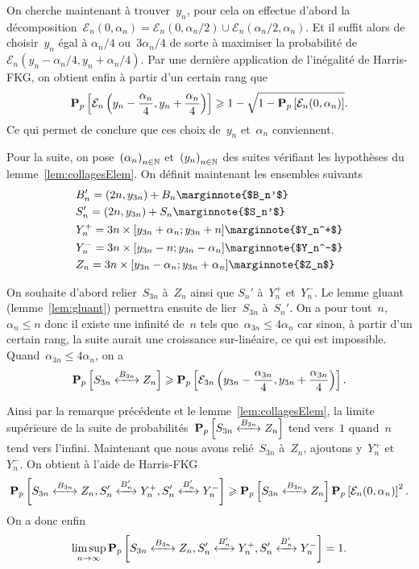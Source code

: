 \begin{dem}
		On cherche maintenant à trouver~$y_n$, pour cela on effectue d'abord la décomposition~$\mathcal{E}_n(0, \alpha_n) = \mathcal{E}_n(0, \alpha_n/2) \cup \mathcal{E}_n(\alpha_n/2, \alpha_n)$. Et il suffit alors de choisir~$y_n$ égal à $\alpha_n/4$ ou~$3\alpha_n/4$ de sorte à maximiser la probabilité de~$\mathcal{E}_n(y_n - \alpha_n/4, y_n + \alpha_n/4)$. Par une dernière application de l'inégalité de Harris-FKG, on obtient enfin à partir d'un certain rang que
		\[
			\bm{\mathrm{P}}_{p}\left[\mathcal{E}_n\left(y_n - \frac{\alpha_n}{4}, y_n + \frac{\alpha_n}{4}\right)\right]
					\geqslant 1 - \sqrt{1 - \bm{\mathrm{P}}_{p}\left[\mathcal{E}_n(0, \alpha_n)\right]}.
		\]
		Ce qui permet de conclure que ces choix de~$y_n$ et~$\alpha_n$ conviennent.
	\end{dem}
	Pour la suite, on pose~$\suite{\alpha}$ et~$\suite{y}$ des suites vérifiant les hypothèses du lemme~\ref{lem:collagesElem}. On définit maintenant les ensembles suivants
	\begin{align*}
		&B_n' = (2n, y_{3n}) + B_n \marginnote{$B_n'$} \\
		&S_n' = (2n, y_{3n}) + S_n \marginnote{$S_n'$} \\
		&Y_n^+ = {3n} \times [y_{3n} + \alpha_n; y_{3n} + n] \marginnote{$Y_n^+$} \\
		&Y_n^- = {3n} \times [y_{3n} - n; y_{3n} - \alpha_n] \marginnote{$Y_n^-$} \\
		&Z_n = {3n} \times [y_{3n} - \alpha_n; y_{3n} + \alpha_n] \marginnote{$Z_n$}
	\end{align*}
	

	On souhaite d'abord relier~$S_{3n}$ à~$Z_n$ ainsi que $S_n'$ à~$Y_n^+$ et~$Y_n^-$. Le lemme gluant (lemme~\ref{lem:gluant}) permettra ensuite de lier~$S_{3n}$ à~$S_n'$. On a pour tout~$n$, $\alpha_n \leq n$ donc il existe une infinité de~$n$ tels que~$\alpha_{3n} \leq 4\alpha_n$ car sinon, à partir d'un certain rang, la suite aurait une croissance sur-linéaire, ce qui est impossible. Quand~$\alpha_{3n} \leq 4\alpha_n$, on a
	\[
		\Pp{\relie[B_{3n}]{S_{3n}}{Z_n}} \geq \Pp{\mathcal{E}_{3n}\left(y_{3n} - \frac{\alpha_{3n}}{4}, y_{3n} + \frac{\alpha_{3n}}{4}\right)}.
	\]

	Ainsi par la remarque précédente et le lemme~\ref{lem:collagesElem}, la limite supérieure de la suite de probabilités~$\Pp{\relie[B_{3n}]{S_{3n}}{Z_n}}$ tend vers~$1$ quand~$n$ tend vers l'infini. Maintenant que nous avons relié~$S_{3n}$ à~$Z_n$, ajoutons y~$Y_n^+$ et~$Y_n^-$. On obtient à l'aide de Harris-FKG
	\[
		\Pp{\relie[B_{3n}]{S_{3n}}{Z_n}, \relie[B_n']{S_n'}{Y_n^+}, \relie[B_n']{S_n'}{Y_n^-}} \geq \Pp{\relie[B_{3n}]{S_{3n}}{Z_n} }\Pp{\mathcal{E}_n(0, \alpha_n)}^2.
	\]
	On a donc enfin
	\[ 
		\limsup_{n \to \infty} \Pp{\relie[B_{3n}]{S_{3n}}{Z_n}, \relie[B_n']{S_n'}{Y_n^+}, \relie[B_n']{S_n'}{Y_n^-}} = 1.
	\]


